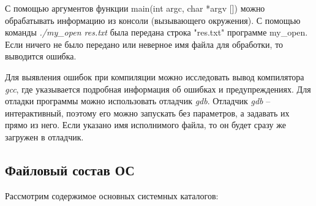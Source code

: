 \documentclass[14pt,a4paper,report]{report}
\begin{document}
С помощью аргументов функции main(int argc, char *argv []) можно обрабатывать информацию из консоли (вызывающего окружения). С помощью команды \emph{./my\_open res.txt} была передана строка "res.txt" программе my\_open. Если ничего не было передано или неверное имя файла для обработки, то выводится ошибка.

Для выявления ошибок при компиляции можно исследовать вывод компилятора \emph{gcc}, где указывается подробная информация об ошибках и предупреждениях. Для отладки программы можно использовать отладчик \emph{gdb}. Отладчик \emph{gdb} – интерактивный, поэтому его можно запускать без параметров, а задавать их прямо из него. Если указано имя исполнимого файла, то он будет сразу же загружен в отладчик.

\subsection{Файловый состав ОС}

Рассмотрим содержимое основных системных каталогов:
\end{document}
